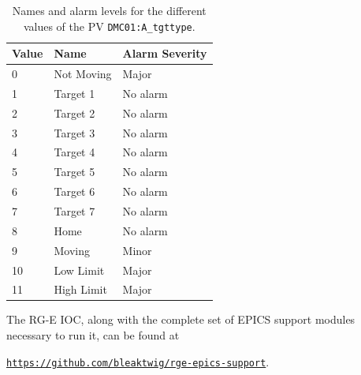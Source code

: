     \begin{table}[b!]
        \caption{Names and alarm levels for the different values of the PV \texttt{DMC01:A\_tgttype}.}

        \begin{center}
            \begin{tabularx}{220pt}{lll}
                \hline
                \textbf{Value} & \textbf{Name} & \textbf{Alarm Severity} \\
                \hline
                 0             & Not Moving    & Major                   \\
                 1             & Target 1      & No alarm                \\
                 2             & Target 2      & No alarm                \\
                 3             & Target 3      & No alarm                \\
                 4             & Target 4      & No alarm                \\
                 5             & Target 5      & No alarm                \\
                 6             & Target 6      & No alarm                \\
                 7             & Target 7      & No alarm                \\
                 8             & Home          & No alarm                \\
                 9             & Moving        & Minor                   \\
                10             & Low Limit     & Major                   \\
                11             & High Limit    & Major                   \\
                \hline
            \end{tabularx}
        \end{center}
        \label{tab::tgttypespv}
    \end{table}

    The RG-E IOC, along with the complete set of EPICS support modules necessary to run it, can be found at
    
    \begin{center}
        \hyperlink{https://github.com/bleaktwig/rge-epics-support}{\texttt{https://github.com/bleaktwig/rge-epics-support}}.
    \end{center}

